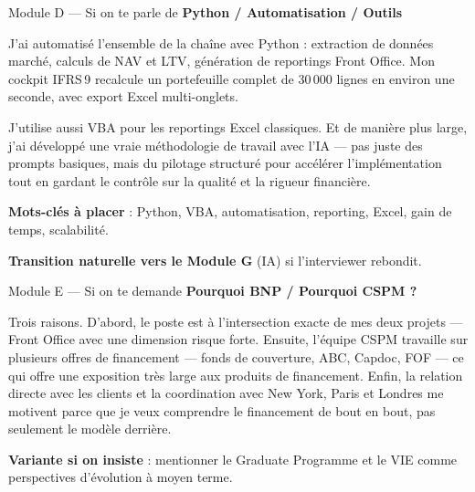 \documentclass[11pt,a4paper]{article}
\begin{document}
\vspace{6pt}

\begin{modulebox}{Module D --- Si on te parle de \textbf{Python / Automatisation / Outils}}

\begin{verbatimbox}
\og J'ai automatis\'e l'ensemble de la cha\^ine avec Python : extraction
de donn\'ees march\'e, calculs de NAV et LTV, g\'en\'eration de reportings
Front Office. Mon cockpit IFRS\,9 recalcule un portefeuille complet de
30\,000 lignes en environ une seconde, avec export Excel multi-onglets.

J'utilise aussi VBA pour les reportings Excel classiques. Et de mani\`ere
plus large, j'ai d\'evelopp\'e une vraie m\'ethodologie de travail avec
l'IA --- pas juste des prompts basiques, mais du pilotage structur\'e
pour acc\'el\'erer l'impl\'ementation tout en gardant le contr\^ole sur
la qualit\'e et la rigueur financi\`ere. \fg{}
\end{verbatimbox}

\textbf{Mots-cl\'es \`a placer} : Python, VBA, automatisation, reporting,
Excel, gain de temps, scalabilit\'e.

\textbf{Transition naturelle vers le Module G} (IA) si l'interviewer rebondit.
\end{modulebox}

\vspace{6pt}

\begin{modulebox}{Module E --- Si on te demande \textbf{\og Pourquoi BNP / Pourquoi CSPM ? \fg{}}}

\begin{verbatimbox}
\og Trois raisons. D'abord, le poste est \`a l'intersection exacte de mes
deux projets --- Front Office avec une dimension risque forte. Ensuite,
l'\'equipe CSPM travaille sur plusieurs offres de financement --- fonds de
couverture, ABC, Capdoc, FOF --- ce qui offre une exposition tr\`es large
aux produits de financement. Enfin, la relation directe avec les clients
et la coordination avec New York, Paris et Londres me motivent parce que
je veux comprendre le financement de bout en bout, pas seulement le
mod\`ele derri\`ere. \fg{}
\end{verbatimbox}

\textbf{Variante si on insiste} : mentionner le Graduate Programme et le
VIE comme perspectives d'\'evolution \`a moyen terme.
\end{modulebox}
\end{document}
